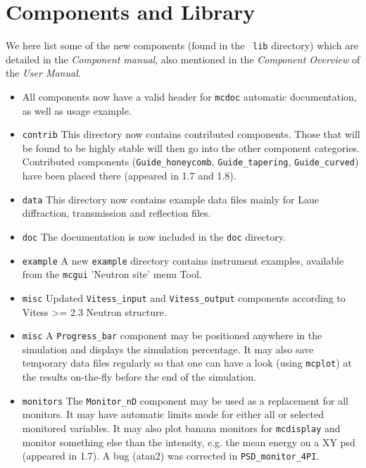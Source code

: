 \section{Components and Library} 
\label{s:new-features:components}
 
  
  We here list some of the new components (found in the \MCS\ \verb+lib+ directory) 
which are detailed in the {\it Component manual}, also mentioned in
the {\it Component Overview} of the {\it User Manual}.
  
\begin{itemize}
\item All components now have a valid header for \texttt{mcdoc} automatic documentation, as well as usage example.
\item \texttt{contrib} This directory now contains contributed components. Those that will be found to be highly stable will then go into the other component categories. Contributed components (\verb+Guide_honeycomb+, \verb+Guide_tapering+, \verb+Guide_curved+) have been
    placed there (appeared in 1.7 and 1.8). 
\item \texttt{data} This directory now contains example data files mainly for Laue diffraction, transmission and reflection files. 
\item \texttt{doc} The documentation is now included in the \verb+doc+ directory. 
\item \texttt{example} A new \verb+example+ directory contains instrument examples, available from the \verb+mcgui+ 'Neutron site' menu Tool.
\item \texttt{misc} Updated \verb+Vitess_input+ and \verb+Vitess_output+ components according to Vitess >= 2.3 Neutron structure.
\item \texttt{misc} A \verb+Progress_bar+ component may be positioned anywhere in the simulation and displays the simulation percentage. It may also save temporary data files regularly so that one can have a look  (using \verb+mcplot+) at the results on-the-fly before the end of the simulation.
\item \texttt{monitors} The \verb+Monitor_nD+ component may be used as a replacement for all monitors. It may have automatic limits mode for either all or selected monitored variables. It may also plot banana monitors for \verb+mcdisplay+ and monitor something else than the intensity, e.g. the mean energy on a XY psd (appeared in 1.7).  A bug (atan2) was corrected in \verb+PSD_monitor_4PI+. 

\end{itemize}
